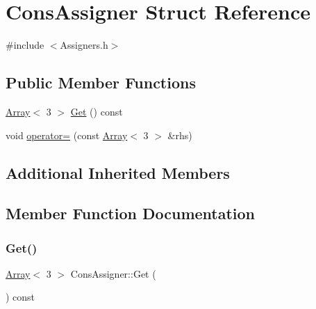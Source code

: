 \hypertarget{structConsAssigner}{}\section{Cons\+Assigner Struct Reference}
\label{structConsAssigner}


{\ttfamily \#include $<$Assigners.\+h$>$}

\subsection*{Public Member Functions}
\begin{DoxyCompactItemize}
\item 
\hyperlink{Includes_8h_abd9de33944f934950000c3929e14ad8d}{Array}$<$ 3 $>$ \hyperlink{structConsAssigner_a506db15528523db3f146df534845e884}{Get} () const
\item 
void \hyperlink{structConsAssigner_a0e0b80533749c1c5ba9a623a24a9a800}{operator=} (const \hyperlink{Includes_8h_abd9de33944f934950000c3929e14ad8d}{Array}$<$ 3 $>$ \&rhs)
\end{DoxyCompactItemize}
\subsection*{Additional Inherited Members}


\subsection{Member Function Documentation}
\mbox{\label{structConsAssigner_a506db15528523db3f146df534845e884}} 
\subsubsection{\texorpdfstring{Get()}{Get()}}
{\footnotesize\ttfamily \hyperlink{Includes_8h_abd9de33944f934950000c3929e14ad8d}{Array}$<$ 3 $>$ Cons\+Assigner\+::\+Get (\begin{DoxyParamCaption}{ }\end{DoxyParamCaption}) const}

\mbox{\label{structConsAssigner_a0e0b80533749c1c5ba9a623a24a9a800}} 
